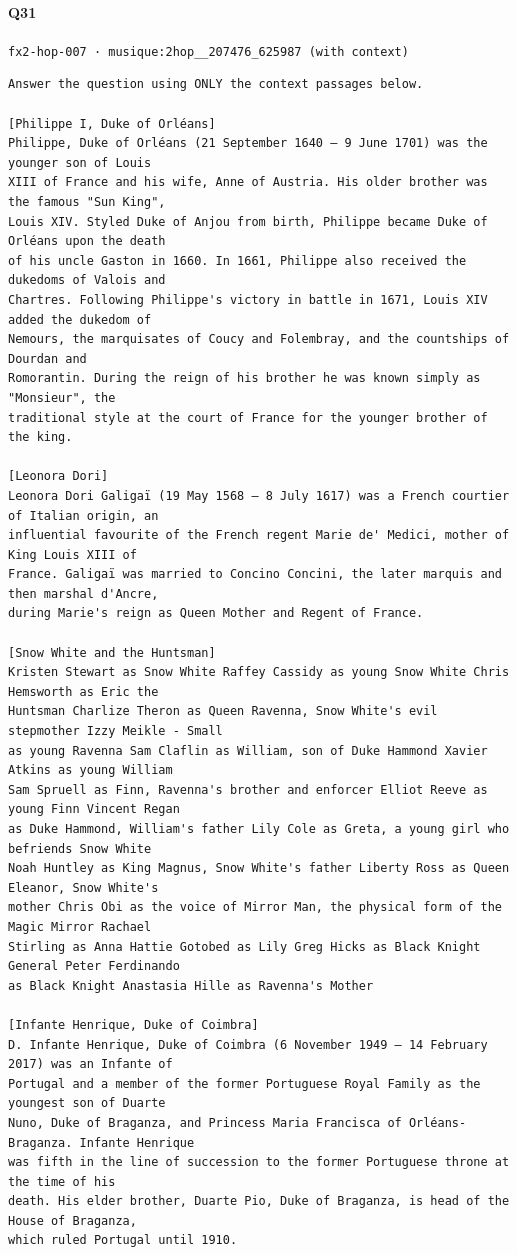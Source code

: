 \documentclass[10pt]{article}
\begin{document}
\paragraph{Q31} \texttt{fx2-hop-007  ·  musique:2hop\_\_207476\_625987 (with context)}
\begin{verbatim}
Answer the question using ONLY the context passages below.

[Philippe I, Duke of Orléans]
Philippe, Duke of Orléans (21 September 1640 – 9 June 1701) was the younger son of Louis
XIII of France and his wife, Anne of Austria. His older brother was the famous "Sun King",
Louis XIV. Styled Duke of Anjou from birth, Philippe became Duke of Orléans upon the death
of his uncle Gaston in 1660. In 1661, Philippe also received the dukedoms of Valois and
Chartres. Following Philippe's victory in battle in 1671, Louis XIV added the dukedom of
Nemours, the marquisates of Coucy and Folembray, and the countships of Dourdan and
Romorantin. During the reign of his brother he was known simply as "Monsieur", the
traditional style at the court of France for the younger brother of the king.

[Leonora Dori]
Leonora Dori Galigaï (19 May 1568 – 8 July 1617) was a French courtier of Italian origin, an
influential favourite of the French regent Marie de' Medici, mother of King Louis XIII of
France. Galigaï was married to Concino Concini, the later marquis and then marshal d'Ancre,
during Marie's reign as Queen Mother and Regent of France.

[Snow White and the Huntsman]
Kristen Stewart as Snow White Raffey Cassidy as young Snow White Chris Hemsworth as Eric the
Huntsman Charlize Theron as Queen Ravenna, Snow White's evil stepmother Izzy Meikle - Small
as young Ravenna Sam Claflin as William, son of Duke Hammond Xavier Atkins as young William
Sam Spruell as Finn, Ravenna's brother and enforcer Elliot Reeve as young Finn Vincent Regan
as Duke Hammond, William's father Lily Cole as Greta, a young girl who befriends Snow White
Noah Huntley as King Magnus, Snow White's father Liberty Ross as Queen Eleanor, Snow White's
mother Chris Obi as the voice of Mirror Man, the physical form of the Magic Mirror Rachael
Stirling as Anna Hattie Gotobed as Lily Greg Hicks as Black Knight General Peter Ferdinando
as Black Knight Anastasia Hille as Ravenna's Mother

[Infante Henrique, Duke of Coimbra]
D. Infante Henrique, Duke of Coimbra (6 November 1949 – 14 February 2017) was an Infante of
Portugal and a member of the former Portuguese Royal Family as the youngest son of Duarte
Nuno, Duke of Braganza, and Princess Maria Francisca of Orléans-Braganza. Infante Henrique
was fifth in the line of succession to the former Portuguese throne at the time of his
death. His elder brother, Duarte Pio, Duke of Braganza, is head of the House of Braganza,
which ruled Portugal until 1910.


\end{verbatim}
\end{document}
